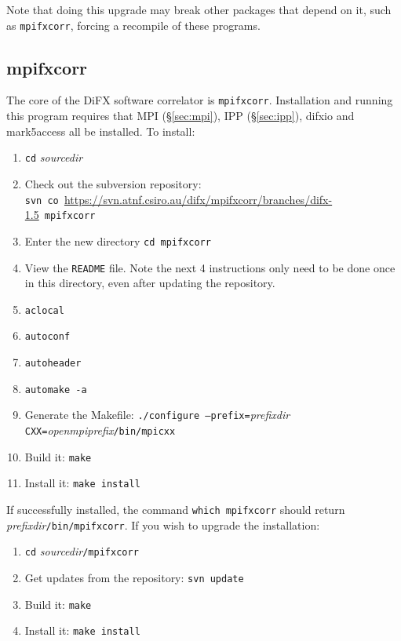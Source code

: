 Note that doing this upgrade may break other packages that depend on it, such as {\tt mpifxcorr}, forcing a recompile of these programs.










\subsection{mpifxcorr}

The core of the DiFX software correlator is {\tt mpifxcorr}.  
Installation and running this program requires that MPI (\S\ref{sec:mpi}), IPP (\S\ref{sec:ipp}), difxio and mark5access all be installed.
To install:
\begin{enumerate}
\item {\tt cd} {\em sourcedir}
\item Check out the subversion repository: \\
{\tt svn co }\url{https://svn.atnf.csiro.au/difx/mpifxcorr/branches/difx-1.5}{\tt\ mpifxcorr}
\item Enter the new directory {\tt cd mpifxcorr}
\item View the {\tt README} file.  
Note the next 4 instructions only need to be done once in this directory, even after updating the repository.
\item {\tt aclocal}
\item {\tt autoconf}
\item {\tt autoheader}
\item {\tt automake -a}
\item Generate the Makefile: {\tt ./configure --prefix=}{\em prefixdir} {\tt CXX=}{\em openmpiprefix}{\tt /bin/mpicxx}
\item Build it: {\tt make}
\item Install it: {\tt make install}
\end{enumerate}

If successfully installed, the command {\tt which mpifxcorr} should return {\em prefixdir}{\tt /bin/mpifxcorr}.
If you wish to upgrade the installation:
\begin{enumerate}
\item {\tt cd} {\em sourcedir}{\tt /mpifxcorr}
\item Get updates from the repository: {\tt svn update}
\item Build it: {\tt make}
\item Install it: {\tt make install}
\end{enumerate}








